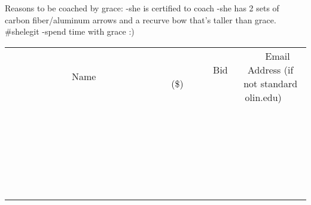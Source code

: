 \documentclass[11pt]{article}
\begin{document}
Reasons to be coached by grace:
-she is certified to coach 
-she has 2 sets of carbon fiber/aluminum arrows and a recurve bow that's taller than grace. \#shelegit
-spend time with grace :)
\\[6ex]
\begin{tabular}{c c c}
~~~~~~~~~~~~~Name~~~~~~~~~~~~~ & ~~~~~~~~~Bid (\$)~~~~~~~~~  & ~~~Email Address (if not standard olin.edu)~~~\\
 & & \\
\hline
 & & \\
\hline
 & & \\
\hline
 & & \\
\hline
 & & \\
\hline
 & & \\
\hline
 & & \\
\hline
 & & \\
\hline
 & & \\
\hline
 & & \\
\hline
 & & \\
\hline
 & & \\
\hline
 & & \\
\hline
 & & \\
\hline
 & & \\
\hline
 & & \\
\hline
 & & \\
\hline
 & & \\
\hline
 & & \\
\hline
 & & \\
\hline
 & & \\
\hline
 & & \\
\hline
 & & \\
\hline
 & & \\
\hline
 & & \\
\hline
 & & \\
\hline
\end{tabular}
\newpage
\end{document}
